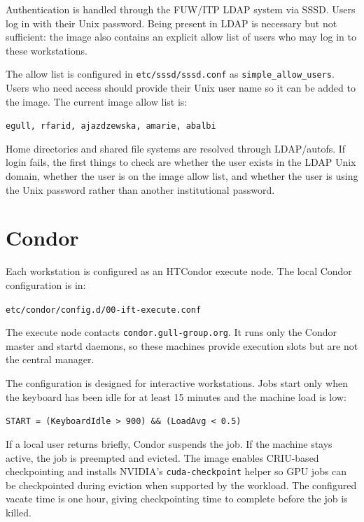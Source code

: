 \documentclass[11pt]{article}
\begin{document}
Authentication is handled through the FUW/ITP LDAP system via SSSD.  Users log
in with their Unix password.  Being present in LDAP is necessary but not
sufficient: the image also contains an explicit allow list of users who may log
in to these workstations.

The allow list is configured in \texttt{etc/sssd/sssd.conf} as
\texttt{simple\_allow\_users}.  Users who need access should provide their Unix
user name so it can be added to the image.  The current image allow list is:

\begin{center}
\texttt{egull, rfarid, ajazdzewska, amarie, abalbi}
\end{center}

Home directories and shared file systems are resolved through LDAP/autofs.  If
login fails, the first things to check are whether the user exists in the LDAP
Unix domain, whether the user is on the image allow list, and whether the user
is using the Unix password rather than another institutional password.

\section{Condor}

Each workstation is configured as an HTCondor execute node.  The local Condor
configuration is in:

\begin{center}
\texttt{etc/condor/config.d/00-ift-execute.conf}
\end{center}

The execute node contacts \texttt{condor.gull-group.org}.  It runs only the
Condor master and startd daemons, so these machines provide execution slots but
are not the central manager.

The configuration is designed for interactive workstations.  Jobs start only
when the keyboard has been idle for at least 15 minutes and the machine load is
low:

\begin{center}
\texttt{START = (KeyboardIdle > 900) \&\& (LoadAvg < 0.5)}
\end{center}

If a local user returns briefly, Condor suspends the job.  If the machine stays
active, the job is preempted and evicted.  The image enables CRIU-based
checkpointing and installs NVIDIA's \texttt{cuda-checkpoint} helper so GPU jobs
can be checkpointed during eviction when supported by the workload.  The
configured vacate time is one hour, giving checkpointing time to complete before
the job is killed.
\end{document}
